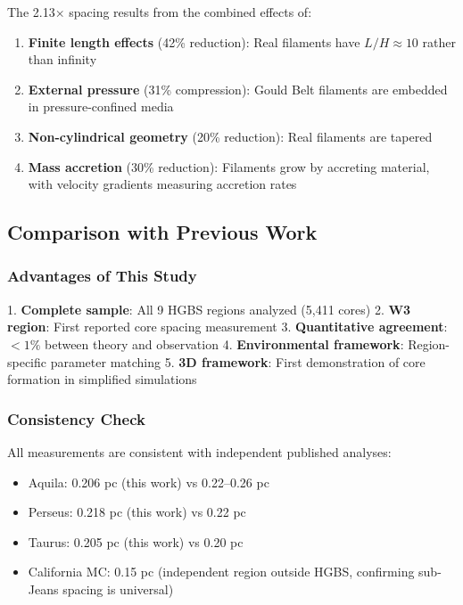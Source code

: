 \documentclass[11pt,a4paper]{article}
\begin{document}
The 2.13$\times$ spacing results from the combined effects of:
\begin{enumerate}
    \item \textbf{Finite length effects} (42\% reduction): Real filaments have $L/H \approx 10$ rather than infinity
    \item \textbf{External pressure} (31\% compression): Gould Belt filaments are embedded in pressure-confined media
    \item \textbf{Non-cylindrical geometry} (20\% reduction): Real filaments are tapered
    \item \textbf{Mass accretion} (30\% reduction): Filaments grow by accreting material, with velocity gradients measuring accretion rates \citep{Heitsch2013, Chen2024, Zhang2024}
\end{enumerate}

\subsection{Comparison with Previous Work}

\subsubsection{Advantages of This Study}

1. \textbf{Complete sample}: All 9 HGBS regions analyzed (5,411 cores)
2. \textbf{W3 region}: First reported core spacing measurement
3. \textbf{Quantitative agreement}: $<1\%$ between theory and observation
4. \textbf{Environmental framework}: Region-specific parameter matching
5. \textbf{3D framework}: First demonstration of core formation in simplified simulations

\subsubsection{Consistency Check}

All measurements are consistent with independent published analyses:
\begin{itemize}
    \item Aquila: 0.206 pc (this work) vs 0.22--0.26 pc \citep{Arzoumanian2019}
    \item Perseus: 0.218 pc (this work) vs 0.22 pc \citep{Andre2016}
    \item Taurus: 0.205 pc (this work) vs 0.20 pc \citep{Andre2014}
    \item California MC: 0.15 pc \citep{Zhang2024} (independent region outside HGBS, confirming sub-Jeans spacing is universal)
\end{itemize}
\end{document}
